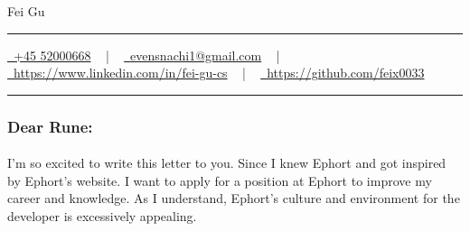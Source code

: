 \documentclass[a4paper]{article}
\makeatletter
\newcommand{\myName}{Fei Gu}
\newcommand{\email}{evensnachi1@gmail.com}
\newcommand{\tel}{+45 52000668}
\newcommand{\linkedin}{https://www.linkedin.com/in/fei-gu-cs}
\newcommand{\github}{https://github.com/feix0033}
\newcommand{\documentTitle}[2]{
\begin{center}
{\LARGE\color{accentSp} #1}
\vspace{10pt}
{\color{accentLine} \hrule}
\vspace{2pt}
\footnotesize{#2}
\vspace{2pt}
{\color{accentLine} \hrule}
\end{center}
}
\makeatother
\begin{document}
\begin{minipage}{\textwidth}
	\colorbox{accentText}{
		
		
	}
\end{minipage}


\vspace{1.5em}

% 

\vspace{1.5em}


\vspace{1.5em}

\pagebreak



\vspace{1.5em}


\vspace{1.5em}


\vspace{1.5em}


\pagebreak




\documentTitle{\myName}{
\href{tel: \tel}{
	\raisebox{-0.05\height} \faPhone\ \tel} ~ | ~
\href{mailto:\email}{
	\raisebox{-0.15\height} \faEnvelope\ \email} ~ | ~
\href{\linkedin}{
	\raisebox{-0.15\height} \faLinkedin\ \linkedin} ~ | ~
\href{\github}{
	\raisebox{-0.15\height} \faGithub\ \github }
}

\subsubsection*{Dear Rune:}
\paragraph{}
I’m so excited to write this letter to you. Since I knew Ephort and got inspired by Ephort’s website. I want to apply for a position at Ephort to improve my career and knowledge. As I understand, Ephort’s culture and environment for the developer is excessively appealing.
\end{document}
